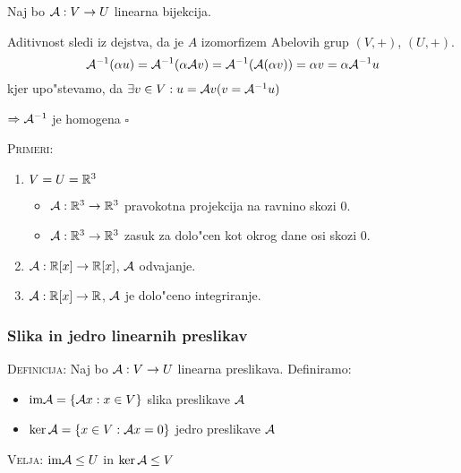Naj bo $\mathcal{A}: V \to U$ linearna bijekcija. 

Aditivnost sledi iz dejstva, da je $A$ izomorfizem Abelovih grup $(V, +)$, $(U, +)$.
\begin{equation*}
\mathcal{A}^{-1}(\alpha u) = \mathcal{A}^{-1}(\alpha \mathcal{A} v) = \mathcal{A}^{-1}(\mathcal{A}(\alpha v)) = \alpha v = \alpha \mathcal{A}^{-1} u
\end{equation*}
kjer upo"stevamo, da $\exists v \in V: u = \mathcal{A} v (v = \mathcal{A}^{-1}u)$

$\Rightarrow \mathcal{A}^{-1}$ je homogena \hfill $\square$

\textsc{Primeri:}
\begin{enumerate}[(1)]
	\item $V = U = \mathbb{R}^3$
	\begin{itemize}
		\item $\mathcal{A}: \mathbb{R}^3 \to \mathbb{R}^3$ pravokotna projekcija na ravnino skozi 0.
		\item $\mathcal{A}: \mathbb{R}^3 \to \mathbb{R}^3$ zasuk za dolo"cen kot okrog dane osi skozi 0.
	\end{itemize}
	\item $\mathcal{A}: \mathbb{R}[x] \to \mathbb{R}[x]$, $\mathcal{A}$ odvajanje.
	\item $\mathcal{A}: \mathbb{R}[x] \to \mathbb{R}$, $\mathcal{A}$ je dolo"ceno integriranje.
\end{enumerate}
%
\subsubsection{Slika in jedro linearnih preslikav}
\textsc{Definicija:} Naj bo $\mathcal{A}: V \to U$ linearna preslikava. Definiramo:
\begin{itemize}
	\item $\text{im} \mathcal{A} = \{\mathcal{A} x: x \in V\}$ slika preslikave $\mathcal{A}$
	\item $\ker \mathcal{A} = \{x \in V: \mathcal{A} x = 0\}$ jedro preslikave $\mathcal{A}$
\end{itemize}
\textsc{Velja:} $\text{im} \mathcal{A} \leq U$ in $\ker \mathcal{A} \leq V$

